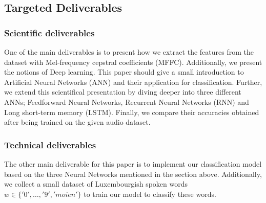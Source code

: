 \subsection{Targeted Deliverables}

\subsubsection{Scientific deliverables}



One of the main deliverables is to present how we extract the features from the
dataset with Mel-frequency cepstral coefficients (MFFC). Additionally, we
present the notions of Deep learning. This paper should give a small
introduction to Artificial Neural Networks (ANN) and their application for
classification. Further, we extend this scientifical presentation by diving
deeper into three different ANNs; Feedforward Neural Networks, Recurrent Neural
Networks (RNN) and Long short-term memory (LSTM). Finally, we compare their
accuracies obtained after being trained on the given audio dataset.

\subsubsection{Technical deliverables} 

The other main deliverable for this paper is to implement our classification
model based on the three Neural Networks mentioned in the section above.
Additionally, we collect a small dataset of Luxembourgish spoken words $w \in
\{'0',\dots,'9','moien'\}$ to train our model to classify these words.
